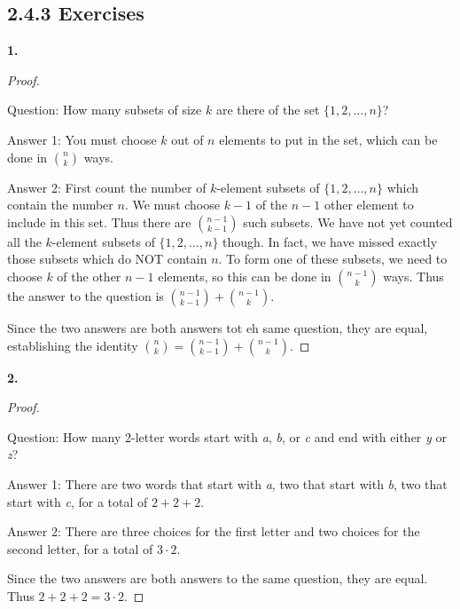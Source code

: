 \documentclass[10pt,]{book}
\theoremstyle{plain}
\theoremstyle{definition}
\theoremstyle{definition}
\theoremstyle{definition}
\numberwithin{equation}{chapter}
\begin{document}
\subsection*{2.4.3 Exercises}
\noindent\textbf{1.}\quad{}\begin{proof}\hypertarget{proof-7}{}

            Question: How many subsets of size \(k\) are there of the set \(\{1,2,\ldots, n\}\)?
\par

            Answer 1: You must choose \(k\) out of \(n\) elements to put in the set, which can be done in \({n \choose k}\) ways.
\par

            Answer 2: First count the number of \(k\)-element subsets of \(\{1,2,\ldots, n\}\) which contain the number \(n\). We must choose \(k-1\) of the \(n-1\) other element to include in this set. Thus there are \({n-1\choose k-1}\) such subsets. We have not yet counted all the \(k\)-element subsets of \(\{1,2,\ldots, n\}\) though. In fact, we have missed exactly those subsets which do NOT contain \(n\). To form one of these subsets, we need to choose \(k\) of the other \(n-1\) elements, so this can be done in \({n-1 \choose k}\) ways. Thus the answer to the question is \({n-1 \choose k-1} + {n-1 \choose k}\).
\par

             Since the two answers are both answers tot eh same question, they are equal, establishing the identity \({n\choose k} = {n-1 \choose k-1} + {n-1 \choose k}\).
\end{proof}
\par\smallskip
\noindent\textbf{2.}\quad{}\begin{proof}\hypertarget{proof-8}{}

            Question: How many 2-letter words start with \emph{a}, \emph{b}, or \emph{c} and end with either \emph{y} or \emph{z}?
\par

            Answer 1: There are two words that start with \emph{a}, two that start with \emph{b}, two that start with \emph{c}, for a total of \(2+2+2\).
\par

            Answer 2: There are three choices for the first letter and two choices for the second letter, for a total of \(3 \cdot 2\).
\par

            Since the two answers are both answers to the same question, they are equal. Thus \(2 + 2 + 2 = 3\cdot 2\).
\end{proof}
\end{document}
